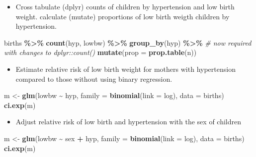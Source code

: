 \documentclass[
]{book}
\newenvironment{Shaded}{\begin{snugshade}}{\end{snugshade}}
\newcommand{\AttributeTok}[1]{\textcolor[rgb]{0.13,0.29,0.53}{#1}}
\newcommand{\CommentTok}[1]{\textcolor[rgb]{0.56,0.35,0.01}{\textit{#1}}}
\newcommand{\FunctionTok}[1]{\textcolor[rgb]{0.13,0.29,0.53}{\textbf{#1}}}
\newcommand{\NormalTok}[1]{#1}
\newcommand{\OtherTok}[1]{\textcolor[rgb]{0.56,0.35,0.01}{#1}}
\newcommand{\SpecialCharTok}[1]{\textcolor[rgb]{0.81,0.36,0.00}{\textbf{#1}}}
\providecommand{\tightlist}{%
  \setlength{\itemsep}{0pt}\setlength{\parskip}{0pt}}
\begin{document}
\begin{itemize}
\tightlist
\item
  Cross tabulate (dplyr) counts of children by hypertension and low birth weight.
  calculate (mutate) proportions of low birth weigth children by hypertension.
\end{itemize}

\begin{Shaded}
\begin{Highlighting}[]
\NormalTok{births }\SpecialCharTok{\%\textgreater{}\%}
  \FunctionTok{count}\NormalTok{(hyp, lowbw) }\SpecialCharTok{\%\textgreater{}\%}
  \FunctionTok{group\_by}\NormalTok{(hyp) }\SpecialCharTok{\%\textgreater{}\%} \CommentTok{\# now required with changes to dplyr::count()}
  \FunctionTok{mutate}\NormalTok{(}\AttributeTok{prop =} \FunctionTok{prop.table}\NormalTok{(n))}
\end{Highlighting}
\end{Shaded}

\begin{itemize}
\tightlist
\item
  Estimate relative risk of low birth weight for mothers with hypertension compared to those without using binary regression.
\end{itemize}

\begin{Shaded}
\begin{Highlighting}[]
\NormalTok{m }\OtherTok{\textless{}{-}} \FunctionTok{glm}\NormalTok{(lowbw }\SpecialCharTok{\textasciitilde{}}\NormalTok{ hyp, }\AttributeTok{family =} \FunctionTok{binomial}\NormalTok{(}\AttributeTok{link =}\NormalTok{ log), }\AttributeTok{data =}\NormalTok{ births)}
\FunctionTok{ci.exp}\NormalTok{(m)}
\end{Highlighting}
\end{Shaded}

\begin{itemize}
\tightlist
\item
  Adjust relative risk of low birth and hypertension with the sex of children
\end{itemize}

\begin{Shaded}
\begin{Highlighting}[]
\NormalTok{m }\OtherTok{\textless{}{-}} \FunctionTok{glm}\NormalTok{(lowbw }\SpecialCharTok{\textasciitilde{}}\NormalTok{ sex }\SpecialCharTok{+}\NormalTok{ hyp, }\AttributeTok{family =} \FunctionTok{binomial}\NormalTok{(}\AttributeTok{link =}\NormalTok{ log), }\AttributeTok{data =}\NormalTok{ births)}
\FunctionTok{ci.exp}\NormalTok{(m)}
\end{Highlighting}
\end{Shaded}
\end{document}
